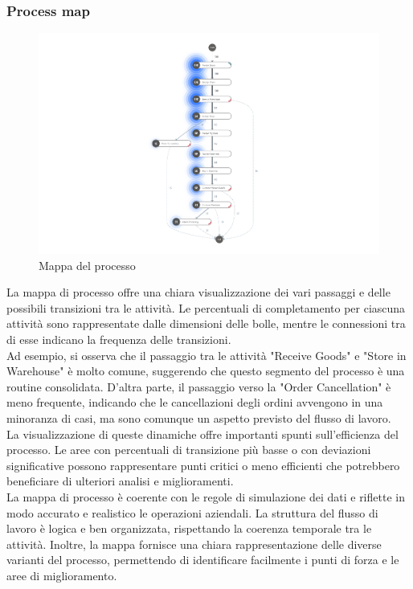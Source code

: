 \documentclass{article}
\begin{document}
\subsubsection{Process map}
\begin{figure}[H]
    \centering
    \includegraphics[width=\textwidth]{imgMicrosoft/PrimaSimulazione/ProcessMapSimulazione1.png}
    \caption{Mappa del processo}
    \label{fig:process-map}
\end{figure}
La mappa di processo offre una chiara visualizzazione dei vari passaggi e delle possibili transizioni tra le attività. Le percentuali di completamento per ciascuna attività sono rappresentate dalle dimensioni delle bolle, mentre le connessioni tra di esse indicano la frequenza delle transizioni.\\
Ad esempio, si osserva che il passaggio tra le attività "Receive Goods" e "Store in Warehouse" è molto comune, suggerendo che questo segmento del processo è una routine consolidata. D'altra parte, il passaggio verso la "Order Cancellation" è meno frequente, indicando che le cancellazioni degli ordini avvengono in una minoranza di casi, ma sono comunque un aspetto previsto del flusso di lavoro.\\
La visualizzazione di queste dinamiche offre importanti spunti sull'efficienza del processo. Le aree con percentuali di transizione più basse o con deviazioni significative possono rappresentare punti critici o meno efficienti che potrebbero beneficiare di ulteriori analisi e miglioramenti.\\
La mappa di processo è coerente con le regole di simulazione dei dati e riflette in modo accurato e realistico le operazioni aziendali. La struttura del flusso di lavoro è logica e ben organizzata, rispettando la coerenza temporale tra le attività. Inoltre, la mappa fornisce una chiara rappresentazione delle diverse varianti del processo, permettendo di identificare facilmente i punti di forza e le aree di miglioramento.
\end{document}
